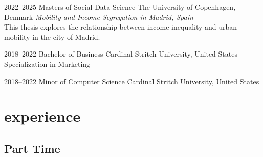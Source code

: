 \documentclass[]{friggeri-cv-a4}
\begin{document}
\begin{entrylist}


\entry
{2022--2025}
{Masters {\normalfont of Social Data Science}}
{The University of Copenhagen, Denmark}
{\emph{Mobility and Income Segregation in Madrid, Spain} \\ This thesis explores the relationship between income inequality and urban mobility in the city of Madrid.}


\entry
{2018--2022}
{Bachelor {\normalfont of Business}}
{Cardinal Stritch University, United States}
{Specialization in Marketing}


\entry
{2018--2022}
{Minor {\normalfont of Computer Science}}
{Cardinal Stritch University, United States}

\end{entrylist}


\section{experience}

\subsection{Part Time}
\end{document}
